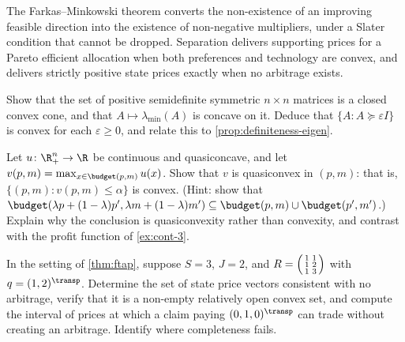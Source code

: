 The Farkas--Minkowski theorem converts the non-existence of an improving feasible
direction into the existence of non-negative multipliers, under a Slater
condition that cannot be dropped. Separation delivers supporting prices for a
Pareto efficient allocation when both preferences and technology are convex, and
delivers strictly positive state prices exactly when no arbitrage exists.

\begin{exercise}\label{ex:cvx-1}
	Show that the set of positive semidefinite symmetric $n\times n$ matrices is a
	closed convex cone, and that $A\mapsto\lambda_{\min}(A)$ is concave on it.
	Deduce that $\{A : A\succeq\varepsilon I\}$ is convex for each
	$\varepsilon\geq0$, and relate this to \autoref{prop:definiteness-eigen}.
\end{exercise}

\begin{exercise}\label{ex:cvx-2}
	Let $u\colon\R^n_+\to\R$ be continuous and quasiconcave, and let
	$v(p,m)=\max_{x\in\budget(p,m)}u(x)$. Show that $v$ is quasiconvex in
	$(p,m)$: that is, $\{(p,m) : v(p,m)\leq\alpha\}$ is convex. (Hint: show that
	$\budget(\lambda p+(1-\lambda)p',\lambda m+(1-\lambda)m')
		\subseteq\budget(p,m)\cup\budget(p',m')$.) Explain why the conclusion is
	quasiconvexity rather than convexity, and contrast with the profit function of
	\autoref{ex:cont-3}.
\end{exercise}

\begin{exercise}\label{ex:cvx-3}
	In the setting of \autoref{thm:ftap}, suppose $S=3$, $J=2$, and
	$R=\begin{psmallmatrix}1&1\\1&2\\1&3\end{psmallmatrix}$ with $q=(1,2)^{\transp}$.
	Determine the set of state price vectors consistent with no arbitrage, verify
	that it is a non-empty relatively open convex set, and compute the interval of
	prices at which a claim paying $(0,1,0)^{\transp}$ can trade without creating an
	arbitrage. Identify where completeness fails.
\end{exercise}
